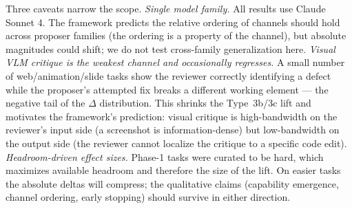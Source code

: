 Three caveats narrow the scope.
\textit{Single model family.} All results use Claude Sonnet 4. The framework predicts the relative ordering of channels should hold across proposer families (the ordering is a property of the channel), but absolute magnitudes could shift; we do not test cross-family generalization here.
\textit{Visual VLM critique is the weakest channel and occasionally regresses.} A small number of web/animation/slide tasks show the reviewer correctly identifying a defect while the proposer's attempted fix breaks a different working element --- the negative tail of the $\Delta$ distribution. This shrinks the Type~3b/3c lift and motivates the framework's prediction: visual critique is high-bandwidth on the reviewer's input side (a screenshot is information-dense) but low-bandwidth on the output side (the reviewer cannot localize the critique to a specific code edit).
\textit{Headroom-driven effect sizes.} Phase-1 tasks were curated to be hard, which maximizes available headroom and therefore the size of the lift. On easier tasks the absolute deltas will compress; the qualitative claims (capability emergence, channel ordering, early stopping) should survive in either direction.

